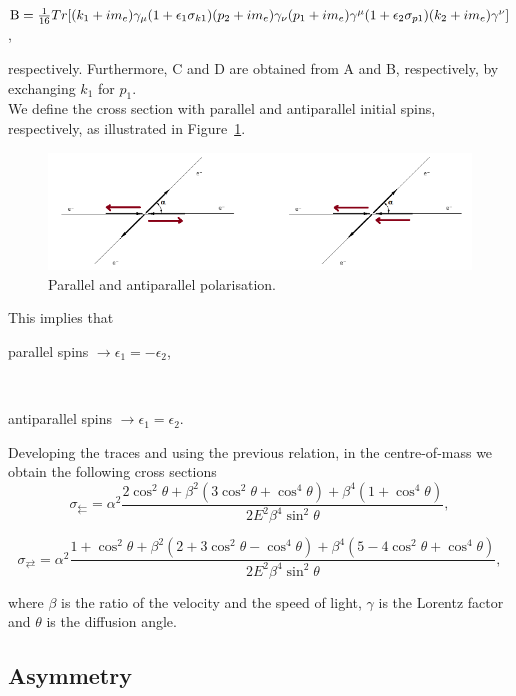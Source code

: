 \documentclass[10pt,swedish, openany]{book}
\begin{document}
\centerline{${\rm B} = \frac{1}{16} Tr[(k_1+im_e)\gamma_{\mu}(1+\epsilon_1\sigma_{k1})(p_2+im_e)\gamma_{\nu}(p_1+im_e)\gamma^{\mu}(1+\epsilon_2\sigma_{p1})(k_2+im_e)\gamma^{\nu}]$,}

respectively. Furthermore, C and D are obtained from A and B, respectively, by exchanging $k_1$ for $p_1$.\\

We define the cross section with parallel and antiparallel initial spins, respectively, as illustrated in Figure~\ref{fig:ParallelAntiparallelPolarisation}.

\begin{figure}[h]
\includegraphics[scale=0.5]{polarisation.png}
\centering
\caption{Parallel and antiparallel polarisation.}
\label{fig:ParallelAntiparallelPolarisation}
\end{figure}

This implies that \\
        \centerline{parallel spins $\rightarrow \epsilon_1 = - \epsilon_2$, }\\
        \centerline{antiparallel spins $\rightarrow \epsilon_1 = \epsilon_2$.}
        
 Developing the traces and using the previous relation, in the centre-of-mass we obtain the following cross sections
 \begin{equation}
     \sigma_{\leftleftarrows} = \alpha^2 \frac{2\cos^2{\theta}+\beta^2(3\cos^2{\theta}+\cos^4{\theta})+\beta^4(1+\cos^4{\theta})}{2E^2\beta^4\sin^2{\theta}},
 \end{equation}
 
 \begin{equation}
     \sigma_{\rightleftarrows} = \alpha^2 \frac{1+\cos^2{\theta}+\beta^2(2+3\cos^2{\theta}-\cos^4{\theta})+\beta^4(5-4\cos^2{\theta}+\cos^4{\theta})}{2E^2\beta^4\sin^2{\theta}},
 \end{equation}
 
where $\beta$ is the ratio of the velocity and the speed of light, $\gamma$ is the Lorentz factor and $\theta$ is the diffusion angle.

\subsection{Asymmetry}
\label{asym}
\end{document}
